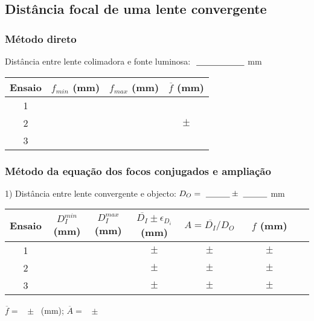 \documentclass[a4paper,12pt]{article}  %
\begin{document}


\subsection{\sf Distância focal de uma lente convergente}



\subsubsection{\sf Método direto}

Distância entre lente colimadora e fonte luminosa: $~\underline{\makebox[2cm][r]{~}}$ mm

\begin{center}
	\begin{tabular}{|c|c|c|c|}
	\hline
	 Ensaio & $ f_{min}$ (mm) & $ f_{max}$ (mm)  & $\overline{f}$ (mm)\\
	\hline \hline
	 1 & \makebox[2cm][r]{} &  \makebox[2cm][r]{}  & \makebox[2cm][r]{}  \\ \cline{1-3}
	  2 & & &  $\quad \pm \quad$ \\ \cline{1-3}
  	  3 & & & \\  \hline
			\end{tabular}
\end{center}
\subsubsection{\sf Método da equação dos focos conjugados e ampliação}

1) Distância entre lente convergente e objecto: $D_O=~\underline{\makebox[1cm][r]{~}}\pm~\underline{\makebox[1cm][r]{~}}$ mm

\begin{center}
	\begin{tabular}{|c|c|c|c|c|c|c|}
	\hline
	 Ensaio &
	  $ D_{I}^{min}$ (mm) & 
	  $ D_I^{max}$ (mm) & 
	  $ \overline{D_{I}}\pm\epsilon_{D_i}$ (mm) &
	  $A=\overline{D_I}/D_O$ &
	  $f$ (mm) \\
	\hline \hline
	1 & & &  $\quad \pm \quad$ & $\quad \pm \quad$& $\qquad \pm \qquad$ \\ \cline{1-6}
	2 & & & $\quad \pm \quad$ & $\quad \pm \quad$& $\quad \pm \quad$  \\ \cline{1-6}
	3 & & & $\quad \pm \quad$ & $\quad \pm \quad$& $\quad \pm \quad$ \\ \hline
	  \end{tabular}
\end{center}
 $\overline{f} =$ ~\underline{\makebox[1cm][r]{~}}$\pm$~\underline{\makebox[1cm][r]{~}} (mm);  $\overline{A} =$ ~\underline{\makebox[1cm][r]{~}}$\pm$~\underline{\makebox[1cm][r]{~}}
\end{document}

